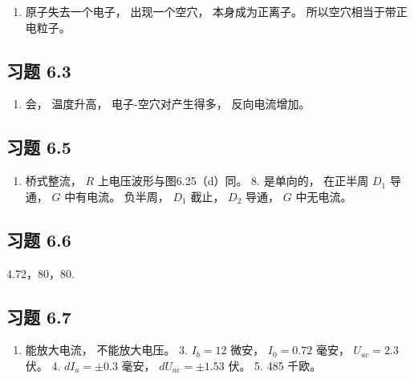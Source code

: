 \begin{enumerate}
\def\labelenumi{\arabic{enumi}.}
\setcounter{enumi}{2}
\tightlist
\item
  原子失去一个电子， 出现一个空穴， 本身成为正离子。
  所以空穴相当于带正电粒子。
\end{enumerate}

\subsection{习题 6.3}\label{ux4e60ux9898-6.3-1}

\begin{enumerate}
\def\labelenumi{\arabic{enumi}.}
\setcounter{enumi}{3}
\tightlist
\item
  会， 温度升高， 电子-空穴对产生得多， 反向电流增加。
\end{enumerate}

\subsection{习题 6.5}\label{ux4e60ux9898-6.5-1}

\begin{enumerate}
\def\labelenumi{\arabic{enumi}.}
\setcounter{enumi}{5}
\tightlist
\item
  桥式整流， \(R\) 上电压波形与图6.25（d）同。 8. 是单向的， 在正半周
  \(D_{1}\) 导通， \(G\) 中有电流。 负半周， \(D_{1}\) 截止， \(D_{2}\)
  导通， \(G\) 中无电流。
\end{enumerate}

\subsection{习题 6.6}\label{ux4e60ux9898-6.6-1}

4.72，80，80.

\subsection{习题 6.7}\label{ux4e60ux9898-6.7-1}

\begin{enumerate}
\def\labelenumi{\arabic{enumi}.}
\setcounter{enumi}{1}
\tightlist
\item
  能放大电流， 不能放大电压。 3. \(I_{b} = 12\) 微安， \(I_{0} = 0.72\)
  毫安， \(U_{ac} = 2.3\) 伏。 4. \(dI_{a} = \pm 0.3\) 毫安，
  \(dU_{ac} = \pm 1.53\) 伏。 5. 485 千欧。
\end{enumerate}


